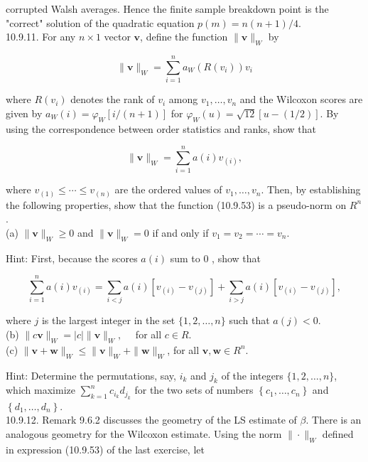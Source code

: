 corrupted Walsh averages. Hence the finite sample breakdown point is the "correct" solution of the quadratic equation $p(m)=n(n+1) / 4$.\\
10.9.11. For any $n \times 1$ vector $\mathbf{v}$, define the function $\|\mathbf{v}\|_{W}$ by


\begin{equation*}
\|\mathbf{v}\|_{W}=\sum_{i=1}^{n} a_{W}\left(R\left(v_{i}\right)\right) v_{i} \tag{10.9.53}
\end{equation*}


where $R\left(v_{i}\right)$ denotes the rank of $v_{i}$ among $v_{1}, \ldots, v_{n}$ and the Wilcoxon scores are given by $a_{W}(i)=\varphi_{W}[i /(n+1)]$ for $\varphi_{W}(u)=\sqrt{12}[u-(1 / 2)]$. By using the correspondence between order statistics and ranks, show that


\begin{equation*}
\|\mathbf{v}\|_{W}=\sum_{i=1}^{n} a(i) v_{(i)}, \tag{10.9.54}
\end{equation*}


where $v_{(1)} \leq \cdots \leq v_{(n)}$ are the ordered values of $v_{1}, \ldots, v_{n}$. Then, by establishing the following properties, show that the function (10.9.53) is a pseudo-norm on $R^{n}$.\\
(a) $\|\mathbf{v}\|_{W} \geq 0$ and $\|\mathbf{v}\|_{W}=0$ if and only if $v_{1}=v_{2}=\cdots=v_{n}$.

Hint: First, because the scores $a(i)$ sum to 0 , show that

$$
\sum_{i=1}^{n} a(i) v_{(i)}=\sum_{i<j} a(i)\left[v_{(i)}-v_{(j)}\right]+\sum_{i>j} a(i)\left[v_{(i)}-v_{(j)}\right],
$$

where $j$ is the largest integer in the set $\{1,2, \ldots, n\}$ such that $a(j)<0$.\\
(b) $\|c \mathbf{v}\|_{W}=|c|\|\mathbf{v}\|_{W}, \quad$ for all $c \in R$.\\
(c) $\|\mathbf{v}+\mathbf{w}\|_{W} \leq\|\mathbf{v}\|_{W}+\|\mathbf{w}\|_{W}$, for all $\mathbf{v}, \mathbf{w} \in R^{n}$.

Hint: Determine the permutations, say, $i_{k}$ and $j_{k}$ of the integers $\{1,2, \ldots, n\}$, which maximize $\sum_{k=1}^{n} c_{i_{k}} d_{j_{k}}$ for the two sets of numbers $\left\{c_{1}, \ldots, c_{n}\right\}$ and $\left\{d_{1}, \ldots, d_{n}\right\}$.\\
10.9.12. Remark 9.6.2 discusses the geometry of the LS estimate of $\beta$. There is an analogous geometry for the Wilcoxon estimate. Using the norm $\|\cdot\|_{W}$ defined in expression (10.9.53) of the last exercise, let

